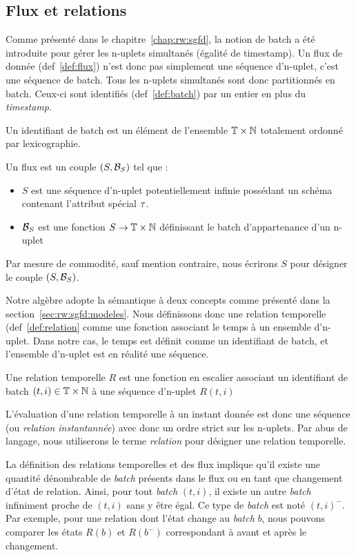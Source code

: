 \subsection{Flux et relations}
Comme présenté dans le chapitre~\ref{chap:rw:sgfd}, la notion de batch a été introduite pour gérer les n-uplets simultanés (égalité de timestamp). Un flux de donnée (def~\ref{def:flux}) n'est donc pas simplement une séquence d'n-uplet, c'est une séquence de batch. Tous les n-uplets simultanés  sont donc partitionnés en batch. Ceux-ci sont identifiés (def~\ref{def:batch}) par un entier en plus du \textit{timestamp}.
\begin{defi}\label{def:batch}
    Un identifiant de batch est un élément de l'ensemble $\mathbb{T}\times\mathbb{N}$ totalement ordonné par lexicographie.
\end{defi}
\begin{defi}[Flux]\label{def:flux}
    Un flux est un couple $(S,\mathcal{B}_S)$ tel que :
    \begin{itemize}
        \item $S$ est une séquence d'n-uplet potentiellement infinie possédant un schéma contenant l'attribut spécial $\tau$.
        \item $\mathcal{B}_S$ est une fonction $S\to \mathbb{T}\times\mathbb{N}$ définissant le batch d'appartenance d'un n-uplet
    \end{itemize}
    
    Par mesure de commodité, sauf mention contraire, nous écrirons $S$ pour désigner le couple $(S,\mathcal{B}_S)$.
\end{defi}

Notre algèbre adopte la sémantique à deux concepts comme présenté dans la section~\ref{sec:rw:sgfd:modeles}. Nous définissons donc une relation temporelle (def~\ref{def:relation} comme une fonction associant le temps à un ensemble d'n-uplet. Dans notre cas, le temps est définit comme un identifiant de batch, et l'ensemble d'n-uplet est en réalité une séquence. 
\begin{defi}\label{def:relation}
	Une relation temporelle $R$ est une fonction en escalier associant un identifiant de batch $(t,i)\in\mathbb{T}\times\mathbb{N}$ à une séquence d'n-uplet $R(t,i)$
\end{defi}
L'évaluation d'une relation temporelle à un instant donnée est donc une séquence (ou \textit{relation instantannée}) avec donc un ordre strict sur les n-uplets. Par abus de langage, nous utiliserons le terme \textit{relation} pour désigner une relation temporelle.

La définition des relations temporelles et des flux implique qu'il existe une quantité dénombrable de \textit{batch} présents dans le flux ou en tant que changement d'état de relation. Ainsi, pour tout \textit{batch} $(t,i)$, il existe un autre \textit{batch} infiniment proche de $(t,i)$ sans y être égal. Ce type de \textit{batch} est noté $(t,i)^-$. Par exemple, pour une relation dont l'état change au \textit{batch} $b$, nous pouvons comparer les états $R(b)$ et $R(b^-)$ correspondant à avant et après le changement.

